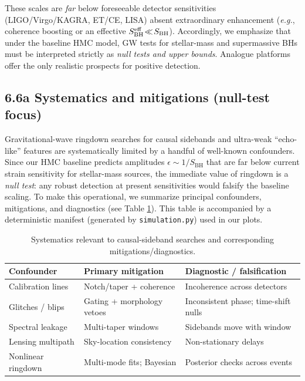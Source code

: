 \documentclass[11pt,a4paper]{article}
\newcommand{\eg}{\textit{e.g.}\xspace}
\newcommand{\HMC}{\textsc{HMC}\xspace}
\theoremstyle{plain}
\theoremstyle{definition}
\theoremstyle{remark}
\begin{document}
These scales are \emph{far} below foreseeable detector sensitivities (LIGO/Virgo/KAGRA, ET/CE, LISA) absent extraordinary enhancement (\eg, coherence boosting or an effective $S_{\rm BH}^{\rm eff}\!\ll\!S_{\rm BH}$).
Accordingly, we emphasize that under the baseline \HMC{} model, GW tests for stellar-mass and supermassive BHs must be interpreted strictly as \emph{null tests and upper bounds}. Analogue platforms offer the only realistic prospects for positive detection.

\subsection*{6.6a Systematics and mitigations (null-test focus)}
Gravitational-wave ringdown searches for causal sidebands and ultra-weak ``echo-like'' features are systematically limited by a handful of well-known confounders. Since our HMC baseline predicts amplitudes \(\epsilon\!\sim\!1/S_{\mathrm{BH}}\) that are far below current strain sensitivity for stellar-mass sources, the immediate value of ringdown is a \emph{null test}: any robust detection at present sensitivities would falsify the baseline scaling. To make this operational, we summarize principal confounders, mitigations, and diagnostics (see Table \ref{tab:gw-systematics}). This table is accompanied by a deterministic manifest (generated by \texttt{simulation.py}) used in our plots.

\begin{table}[t]
\centering
\begin{tabular*}{\textwidth}{@{\extracolsep{\fill}}lll@{}}
\textbf{Confounder} & \textbf{Primary mitigation} & \textbf{Diagnostic / falsification} \\\hline
Calibration lines & Notch/taper + coherence & Incoherence across detectors \\
Glitches / blips & Gating + morphology vetoes & Inconsistent phase; time-shift nulls \\
Spectral leakage & Multi-taper windows & Sidebands move with window \\
Lensing multipath & Sky-location consistency & Non-stationary delays \\
Nonlinear ringdown & Multi-mode fits; Bayesian & Posterior checks across events \\
\end{tabular*}
\caption{Systematics relevant to causal-sideband searches and corresponding mitigations/diagnostics.}
\label{tab:gw-systematics}
\end{table}
\end{document}
